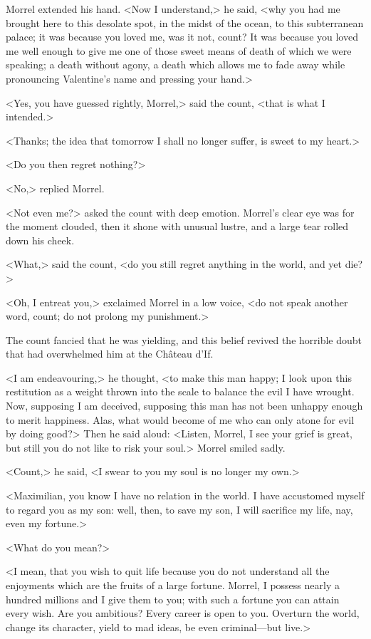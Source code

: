  Morrel extended his hand. <Now I understand,> he said, <why you had me brought here to this desolate spot, in the midst of the ocean, to this subterranean palace; it was because you loved me, was it not, count? It was because you loved me well enough to give me one of those sweet means of death of which we were speaking; a death without agony, a death which allows me to fade away while pronouncing Valentine's name and pressing your hand.> 

 <Yes, you have guessed rightly, Morrel,> said the count, <that is what I intended.> 

 <Thanks; the idea that tomorrow I shall no longer suffer, is sweet to my heart.> 

 <Do you then regret nothing?> 

 <No,> replied Morrel. 

 <Not even me?> asked the count with deep emotion. Morrel's clear eye was for the moment clouded, then it shone with unusual lustre, and a large tear rolled down his cheek. 

 <What,> said the count, <do you still regret anything in the world, and yet die?> 

 <Oh, I entreat you,> exclaimed Morrel in a low voice, <do not speak another word, count; do not prolong my punishment.> 

 The count fancied that he was yielding, and this belief revived the horrible doubt that had overwhelmed him at the Château d'If. 

 <I am endeavouring,> he thought, <to make this man happy; I look upon this restitution as a weight thrown into the scale to balance the evil I have wrought. Now, supposing I am deceived, supposing this man has not been unhappy enough to merit happiness. Alas, what would become of me who can only atone for evil by doing good?>  Then he said aloud: <Listen, Morrel, I see your grief is great, but still you do not like to risk your soul.> Morrel smiled sadly. 

 <Count,> he said, <I swear to you my soul is no longer my own.> 

 <Maximilian, you know I have no relation in the world. I have accustomed myself to regard you as my son: well, then, to save my son, I will sacrifice my life, nay, even my fortune.> 

 <What do you mean?> 

 <I mean, that you wish to quit life because you do not understand all the enjoyments which are the fruits of a large fortune. Morrel, I possess nearly a hundred millions and I give them to you; with such a fortune you can attain every wish. Are you ambitious? Every career is open to you. Overturn the world, change its character, yield to mad ideas, be even criminal—but live.> 

